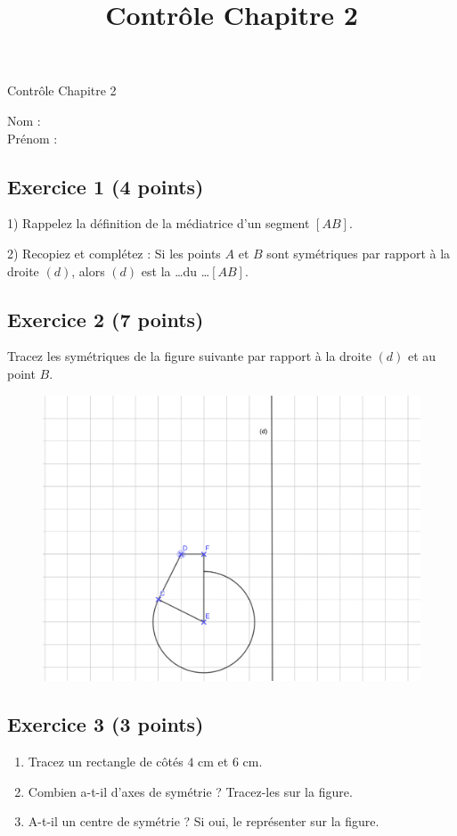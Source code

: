\documentclass[14 pt]{extarticle}
\title{Contrôle Chapitre 2}
\date{}
\theoremstyle{plain}
\begin{document}
\begin{center}{\Large Contrôle Chapitre 2}\\ 
 \end{center}
 Nom : \\
 Prénom : \\
 \subsection*{Exercice 1 (4 points)}
 
 1) Rappelez la définition de la médiatrice d'un segment $[AB]$. 
 
 2) Recopiez et complétez : Si les points $A$ et $B$ sont symétriques par rapport à la droite $(d)$, alors $(d)$ est la \ldots du \ldots $[AB]$. 
 \subsection*{Exercice 2 (7 points)}
 
 Tracez les symétriques de la figure suivante par rapport à la droite $(d)$ et au point $B$. 
 
 \begin{figure}[H]
 \center
 \includegraphics[scale=.55]{Exo1b.png}
 \end{figure}
 
 \subsection*{Exercice 3 (3 points)}
 
 \begin{enumerate}
 \item Tracez un rectangle de côtés $4$ cm et $6$ cm. 
 \item Combien a-t-il d'axes de symétrie ? Tracez-les sur la figure.
 \item A-t-il un centre de symétrie ? Si oui, le représenter sur la
 figure. 
 \end{enumerate}
 
\end{document}
